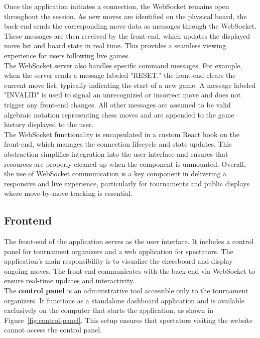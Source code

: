 Once the application initiates a connection, the WebSocket remains open throughout the session. As new moves are identified on the physical board, the back-end sends the corresponding move data as messages through the WebSocket. These messages are then received by the front-end, which updates the displayed move list and board state in real time. This provides a seamless viewing experience for users following live games. \\

The WebSocket server also handles specific command messages. For example, when the server sends a message labeled "RESET," the front-end clears the current move list, typically indicating the start of a new game. A message labeled "INVALID" is used to signal an unrecognized or incorrect move and does not trigger any front-end changes. All other messages are assumed to be valid algebraic notation representing chess moves and are appended to the game history displayed to the user. \\

The WebSocket functionality is encapsulated in a custom React hook on the front-end, which manages the connection lifecycle and state updates. This abstraction simplifies integration into the user interface and ensures that resources are properly cleaned up when the component is unmounted. Overall, the use of WebSocket communication is a key component in delivering a responsive and live experience, particularly for tournaments and public displays where move-by-move tracking is essential.

\subsection{Frontend}
The front-end of the application serves as the user interface. It includes a control panel for tournament organizers and a web application for spectators. The application's main responsibility is to visualize the chessboard and display ongoing moves. The front-end communicates with the back-end via WebSocket to ensure real-time updates and interactivity. \\

The \textbf{control panel} is an administrative tool accessible only to the tournament organizers. It functions as a standalone dashboard application and is available exclusively on the computer that starts the application, as shown in Figure~\ref{fig:control-panel}. This setup ensures that spectators visiting the website cannot access the control panel. \\

